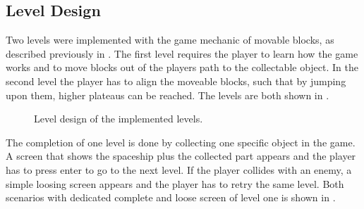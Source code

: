 \subsection{Level Design}\label{sec:game_design_level}
Two levels were implemented with the game mechanic of movable blocks, as described previously in .
The first level requires the player to learn how the game works and to move blocks out of the players path to the collectable object.
In the second level the player has to align the moveable blocks, such that by jumping upon them, higher plateaus can be reached.
The levels are both shown in .
\begin{figure}[!ht]
  \centering
  \qquad
  \caption{Level design of the implemented levels.}
  \label{fig:game_design_level}
\end{figure}
\FloatBarrier
\noindent
The completion of one level is done by collecting one specific object in the game.
A screen that shows the spaceship plus the collected part appears and the player has to press enter to go to the next level.
If the player collides with an enemy, a simple loosing screen appears and the player has to retry the same level.
Both scenarios with dedicated complete and loose screen of level one is shown in .
